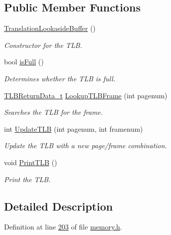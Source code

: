 \subsection*{Public Member Functions}
\begin{DoxyCompactItemize}
\item 
\hyperlink{classTranslationLookasideBuffer_ad6df9fde44600dedcde0a0d7542e357a}{Translation\+Lookaside\+Buffer} ()
\begin{DoxyCompactList}\small\item\em Constructor for the T\+LB. \end{DoxyCompactList}\item 
bool \hyperlink{classTranslationLookasideBuffer_a6416b56aa9b1593b602281f3a81af091}{is\+Full} ()
\begin{DoxyCompactList}\small\item\em Determines whether the T\+LB is full. \end{DoxyCompactList}\item 
\hyperlink{structTLBReturnData__t}{T\+L\+B\+Return\+Data\+\_\+t} \hyperlink{classTranslationLookasideBuffer_a411659ccd7cb5b72a165bc69cc353e0a}{Lookup\+T\+L\+B\+Frame} (int pagenum)
\begin{DoxyCompactList}\small\item\em Searches the T\+LB for the frame. \end{DoxyCompactList}\item 
int \hyperlink{classTranslationLookasideBuffer_a68fe2b0deb2abb9854764471d7c2cba3}{Update\+T\+LB} (int pagenum, int framenum)
\begin{DoxyCompactList}\small\item\em Update the T\+LB with a new page/frame combination. \end{DoxyCompactList}\item 
void \hyperlink{classTranslationLookasideBuffer_a1f92817ce0487d710c6ef5b0176dd358}{Print\+T\+LB} ()
\begin{DoxyCompactList}\small\item\em Print the T\+LB. \end{DoxyCompactList}\end{DoxyCompactItemize}


\subsection{Detailed Description}


Definition at line \hyperlink{memory_8h_source_l00203}{203} of file \hyperlink{memory_8h_source}{memory.\+h}.



